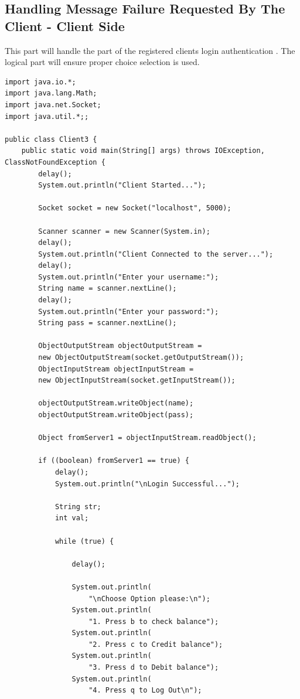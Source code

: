 \documentclass[11pt]{article}
\begin{document}
\subsection{Handling Message Failure Requested By The Client - Client Side}
This part will handle the part of the registered clients login authentication . The logical part will ensure proper choice selection is used.
\
\begin{verbatim}
import java.io.*;
import java.lang.Math;
import java.net.Socket;
import java.util.*;;

public class Client3 {
    public static void main(String[] args) throws IOException, ClassNotFoundException {
        delay();
        System.out.println("Client Started...");

        Socket socket = new Socket("localhost", 5000);

        Scanner scanner = new Scanner(System.in);
        delay();
        System.out.println("Client Connected to the server...");
        delay();
        System.out.println("Enter your username:");
        String name = scanner.nextLine();
        delay();
        System.out.println("Enter your password:");
        String pass = scanner.nextLine();

        ObjectOutputStream objectOutputStream = 
        new ObjectOutputStream(socket.getOutputStream());
        ObjectInputStream objectInputStream = 
        new ObjectInputStream(socket.getInputStream());

        objectOutputStream.writeObject(name);
        objectOutputStream.writeObject(pass);

        Object fromServer1 = objectInputStream.readObject();

        if ((boolean) fromServer1 == true) {
            delay();
            System.out.println("\nLogin Successful...");

            String str;
            int val;

            while (true) {

                delay();

                System.out.println(
                    "\nChoose Option please:\n");
                System.out.println(
                    "1. Press b to check balance");
                System.out.println(
                    "2. Press c to Credit balance");
                System.out.println(
                    "3. Press d to Debit balance");
                System.out.println(
                    "4. Press q to Log Out\n");


\end{verbatim}
\end{document}
